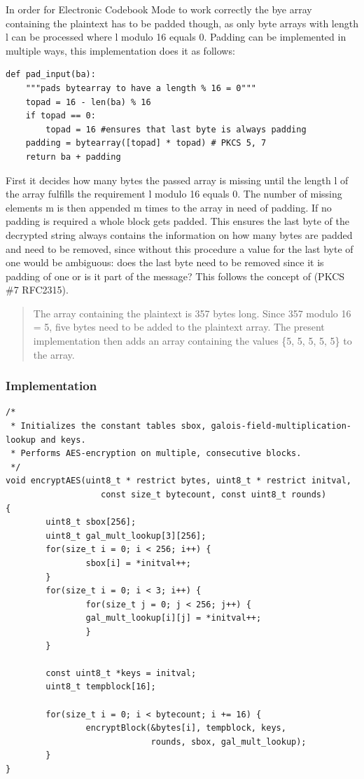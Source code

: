 In order for Electronic Codebook Mode to work correctly the bye array
containing the plaintext has to be padded though, as only byte arrays
with length l can be processed where l modulo 16 equals 0. Padding can
be implemented in multiple ways, this implementation does it as follows:

\begin{lstlisting}
def pad_input(ba):
    """pads bytearray to have a length % 16 = 0"""
    topad = 16 - len(ba) % 16
    if topad == 0:
        topad = 16 #ensures that last byte is always padding
    padding = bytearray([topad] * topad) # PKCS 5, 7
    return ba + padding
\end{lstlisting}

First it decides how many bytes the passed array is missing until the
length l of the array fulfills the requirement l modulo 16 equals 0. The
number of missing elements m is then appended m times to the array in
need of padding. If no padding is required a whole block gets padded.
This ensures the last byte of the decrypted string always contains the
information on how many bytes are padded and need to be removed, since
without this procedure a value for the last byte of one would be
ambiguous: does the last byte need to be removed since it is padding of
one or is it part of the message? This follows the concept of (PKCS \#7
RFC2315).

\begin{quote}
The array containing the plaintext is 357 bytes long. Since 357 modulo 16 = 5,
five bytes need to be added to the plaintext array. The present
implementation then adds an array containing the values \{5, 5, 5, 5,
5\} to the array.
\end{quote}

\hypertarget{implementation-6}{%
\subsubsection{Implementation}\label{implementation-6}}

\begin{lstlisting}
/*
 * Initializes the constant tables sbox, galois-field-multiplication-lookup and keys.
 * Performs AES-encryption on multiple, consecutive blocks.
 */
void encryptAES(uint8_t * restrict bytes, uint8_t * restrict initval, 
                   const size_t bytecount, const uint8_t rounds)
{   
        uint8_t sbox[256];
        uint8_t gal_mult_lookup[3][256];
        for(size_t i = 0; i < 256; i++) {
                sbox[i] = *initval++;
        }
        for(size_t i = 0; i < 3; i++) {
                for(size_t j = 0; j < 256; j++) {
                gal_mult_lookup[i][j] = *initval++;
                }
        }
        
        const uint8_t *keys = initval;
        uint8_t tempblock[16];
        
        for(size_t i = 0; i < bytecount; i += 16) {
                encryptBlock(&bytes[i], tempblock, keys, 
                             rounds, sbox, gal_mult_lookup);
        }
}
\end{lstlisting}

